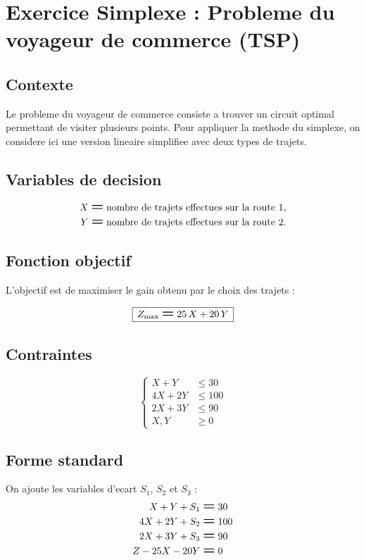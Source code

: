 \documentclass[12pt,a4paper]{article}
\newcommand{\Eq}{\mathrel{\text{\Large\bfseries =}}}
\newcommand{\Leq}{\leqslant}
\newcommand{\Geq}{\geqslant}
\newcommand{\BoxedEq}[1]{%
  \begin{equation*}
    \boxed{\,\displaystyle #1\,}
  \end{equation*}%
}
\begin{document}
\section*{Exercice Simplexe : Probleme du voyageur de commerce (TSP)}

\subsection*{Contexte}
Le probleme du voyageur de commerce consiste a trouver un circuit optimal permettant de visiter plusieurs points. Pour appliquer la methode du simplexe, on considere ici une version lineaire simplifiee avec deux types de trajets.

\subsection*{Variables de decision}
\[
\begin{aligned}
X &\Eq \text{nombre de trajets effectues sur la route 1}, \\
Y &\Eq \text{nombre de trajets effectues sur la route 2}.
\end{aligned}
\]

\subsection*{Fonction objectif}
L'objectif est de maximiser le gain obtenu par le choix des trajets :

\BoxedEq{Z_{\mathrm{max}} \Eq 25\,X + 20\,Y}

\subsection*{Contraintes}
\[
\left\{
\begin{aligned}
X + Y    &\Leq 30  \\
4X + 2Y  &\Leq 100 \\
2X + 3Y  &\Leq 90  \\
X, Y     &\Geq 0
\end{aligned}
\right.
\]

\subsection*{Forme standard}
On ajoute les variables d'ecart \(S_1\), \(S_2\) et \(S_3\) :
\[
\begin{aligned}
X + Y + S_1            &\Eq 30  \\
4X + 2Y + S_2          &\Eq 100 \\
2X + 3Y + S_3          &\Eq 90  \\
Z - 25X - 20Y          &\Eq 0
\end{aligned}
\]
\end{document}
